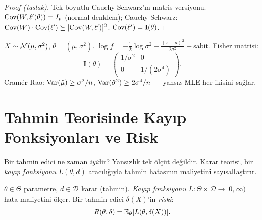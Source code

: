 \begin{proof}[Proof (taslak)]
Tek boyutlu Cauchy-Schwarz'ın matris versiyonu. $\operatorname{Cov}(W,\ell'(\theta))=I_p$ (normal denklem); Cauchy-Schwarz: $\operatorname{Cov}(W)\cdot\operatorname{Cov}(\ell')\succeq[\operatorname{Cov}(W,\ell')]^2$. $\operatorname{Cov}(\ell')=\mathbf{I}(\theta)$.
\end{proof}

\begin{ornek}\label{ex:normal_fisher}
$X\sim\mathcal{N}(\mu,\sigma^2)$, $\theta=(\mu,\sigma^2)$. $\log f = -\frac12\log\sigma^2 - \frac{(x-\mu)^2}{2\sigma^2}+$sabit. Fisher matrisi:
\[
  \mathbf{I}(\theta) = \begin{pmatrix}1/\sigma^2 & 0 \\ 0 & 1/(2\sigma^4)\end{pmatrix}.
\]
Cramér-Rao: $\operatorname{Var}(\hat\mu)\geq\sigma^2/n$, $\operatorname{Var}(\hat\sigma^2)\geq2\sigma^4/n$ --- yansız MLE her ikisini sağlar.
\end{ornek}

\section{Tahmin Teorisinde Kayıp Fonksiyonları ve Risk}
\label{sec:kayip_risk}

\begin{kesif}
Bir tahmin edici ne zaman \emph{iyi}dir? Yansızlık tek ölçüt değildir. Karar teorisi, bir \emph{kayıp fonksiyonu} $L(\theta,d)$ aracılığıyla tahmin hatasının maliyetini sayısallaştırır.
\end{kesif}

\begin{tanim}\label{def:kayip_risk}
$\theta\in\Theta$ parametre, $d\in\mathcal{D}$ karar (tahmin). \emph{Kayıp fonksiyonu} $L:\Theta\times\mathcal{D}\to[0,\infty)$ hata maliyetini ölçer. Bir tahmin edici $\delta(X)$'in \emph{riski}:
\[
  R(\theta,\delta) = \mathbb{E}_\theta[L(\theta,\delta(X))].
\]
\end{tanim}

